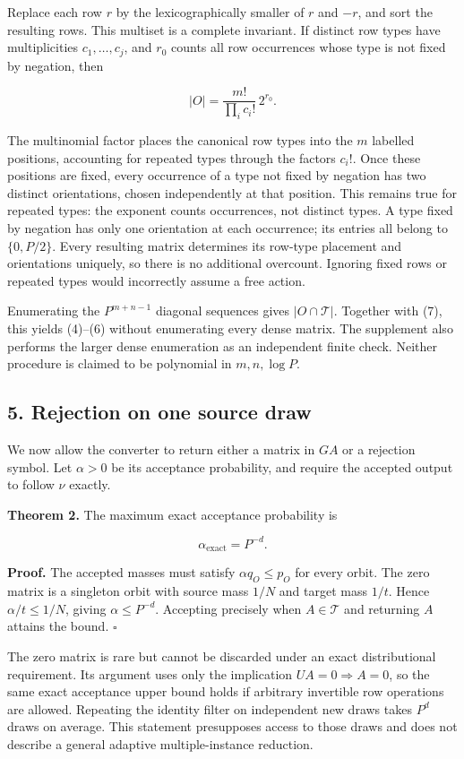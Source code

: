 \documentclass[
]{article}
\begin{document}
Replace each row \(r\) by the lexicographically smaller of \(r\) and
\(-r\), and sort the resulting rows. This multiset is a complete
invariant. If distinct row types have multiplicities \(c_1,\ldots,c_j\),
and \(r_0\) counts all row occurrences whose type is not fixed by
negation, then

\[
|O|=\frac{m!}{\prod_i c_i!}\,2^{r_0}.
\tag{7}
\]

The multinomial factor places the canonical row types into the \(m\)
labelled positions, accounting for repeated types through the factors
\(c_i!\). Once these positions are fixed, every occurrence of a type not
fixed by negation has two distinct orientations, chosen independently at
that position. This remains true for repeated types: the exponent counts
occurrences, not distinct types. A type fixed by negation has only one
orientation at each occurrence; its entries all belong to \(\{0,P/2\}\).
Every resulting matrix determines its row-type placement and
orientations uniquely, so there is no additional overcount. Ignoring
fixed rows or repeated types would incorrectly assume a free action.

Enumerating the \(P^{m+n-1}\) diagonal sequences gives
\(|O\cap\mathcal T|\). Together with (7), this yields (4)--(6) without
enumerating every dense matrix. The supplement also performs the larger
dense enumeration as an independent finite check. Neither procedure is
claimed to be polynomial in \(m,n,\log P\).

\subsection{5. Rejection on one source
draw}\label{rejection-on-one-source-draw}

We now allow the converter to return either a matrix in \(GA\) or a
rejection symbol. Let \(\alpha>0\) be its acceptance probability, and
require the accepted output to follow \(\nu\) exactly.

\textbf{Theorem 2.} The maximum exact acceptance probability is

\[
\alpha_{\mathrm{exact}}=P^{-d}.
\tag{8}
\]

\textbf{Proof.} The accepted masses must satisfy \(\alpha q_O\le p_O\)
for every orbit. The zero matrix is a singleton orbit with source mass
\(1/N\) and target mass \(1/t\). Hence \(\alpha/t\le1/N\), giving
\(\alpha\le P^{-d}\). Accepting precisely when \(A\in\mathcal T\) and
returning \(A\) attains the bound. \(\square\)

The zero matrix is rare but cannot be discarded under an exact
distributional requirement. Its argument uses only the implication
\(UA=0\Rightarrow A=0\), so the same exact acceptance upper bound holds
if arbitrary invertible row operations are allowed. Repeating the
identity filter on independent new draws takes \(P^d\) draws on average.
This statement presupposes access to those draws and does not describe a
general adaptive multiple-instance reduction.
\end{document}
